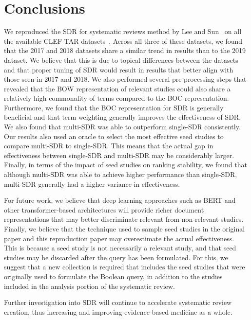 \vspace{-12pt}
\section{Conclusions}
\vspace{-8pt}

We reproduced the SDR for systematic reviews method by Lee and Sun~\cite{lee2018seed} on all the available CLEF TAR datasets~\cite{kanoulas2017clef,kanoulas2018clef,kanoulas2019clef}.
%
Across all three of these datasets, we found that the 2017 and 2018 datasets share a similar trend in results than to the 2019 dataset. We believe that this is due to topical differences between the datasets and that proper tuning of SDR would result in results that better align with those seen in 2017 and 2018.
%
We also performed several pre-processing steps that revealed that the BOW representation of relevant studies could also share a relatively high commonality of terms compared to the BOC representation. Furthermore, we found that the BOC representation for SDR is generally beneficial and that term weighting generally improves the effectiveness of SDR.
%
We also found that multi-SDR was able to outperform single-SDR consistently. Our results also used an oracle to select the most effective seed studies to compare multi-SDR to single-SDR. This means that the actual gap in effectiveness between single-SDR and multi-SDR may be considerably larger.
%
Finally, in terms of the impact of seed studies on ranking stability, we found that although multi-SDR was able to achieve higher performance than single-SDR, multi-SDR generally had a higher variance in effectiveness.
%

For future work, we believe that deep learning approaches such as BERT and other transformer-based architectures will provide richer document representations that may better discriminate relevant from non-relevant studies. Finally, we believe that the technique used to sample seed studies in the original paper and this reproduction paper may overestimate the actual effectiveness. This is because a seed study is not necessarily a relevant study, and that seed studies may be discarded after the query has been formulated. For this, we suggest that a new collection is required that includes the seed studies that were originally used to formulate the Boolean query, in addition to the studies included in the analysis portion of the systematic review.

Further investigation into SDR will continue to accelerate systematic review creation, thus increasing and improving evidence-based medicine as a whole.